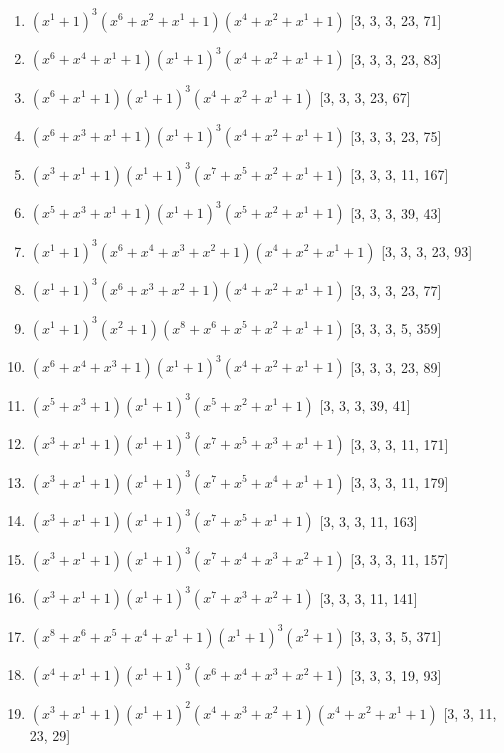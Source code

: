 \documentclass[10pt,twocolumn]{article}
\begin{document}
\begin{enumerate}
\item $(x^{1} + 1)^{3}(x^{6} + x^{2} + x^{1} + 1)(x^{4} + x^{2} + x^{1} + 1)$  [3, 3, 3, 23, 71]
\item $(x^{6} + x^{4} + x^{1} + 1)(x^{1} + 1)^{3}(x^{4} + x^{2} + x^{1} + 1)$  [3, 3, 3, 23, 83]
\item $(x^{6} + x^{1} + 1)(x^{1} + 1)^{3}(x^{4} + x^{2} + x^{1} + 1)$  [3, 3, 3, 23, 67]
\item $(x^{6} + x^{3} + x^{1} + 1)(x^{1} + 1)^{3}(x^{4} + x^{2} + x^{1} + 1)$  [3, 3, 3, 23, 75]
\item $(x^{3} + x^{1} + 1)(x^{1} + 1)^{3}(x^{7} + x^{5} + x^{2} + x^{1} + 1)$  [3, 3, 3, 11, 167]
\item $(x^{5} + x^{3} + x^{1} + 1)(x^{1} + 1)^{3}(x^{5} + x^{2} + x^{1} + 1)$  [3, 3, 3, 39, 43]
\item $(x^{1} + 1)^{3}(x^{6} + x^{4} + x^{3} + x^{2} + 1)(x^{4} + x^{2} + x^{1} + 1)$  [3, 3, 3, 23, 93]
\item $(x^{1} + 1)^{3}(x^{6} + x^{3} + x^{2} + 1)(x^{4} + x^{2} + x^{1} + 1)$  [3, 3, 3, 23, 77]
\item $(x^{1} + 1)^{3}(x^{2} + 1)(x^{8} + x^{6} + x^{5} + x^{2} + x^{1} + 1)$  [3, 3, 3, 5, 359]
\item $(x^{6} + x^{4} + x^{3} + 1)(x^{1} + 1)^{3}(x^{4} + x^{2} + x^{1} + 1)$  [3, 3, 3, 23, 89]
\item $(x^{5} + x^{3} + 1)(x^{1} + 1)^{3}(x^{5} + x^{2} + x^{1} + 1)$  [3, 3, 3, 39, 41]
\item $(x^{3} + x^{1} + 1)(x^{1} + 1)^{3}(x^{7} + x^{5} + x^{3} + x^{1} + 1)$  [3, 3, 3, 11, 171]
\item $(x^{3} + x^{1} + 1)(x^{1} + 1)^{3}(x^{7} + x^{5} + x^{4} + x^{1} + 1)$  [3, 3, 3, 11, 179]
\item $(x^{3} + x^{1} + 1)(x^{1} + 1)^{3}(x^{7} + x^{5} + x^{1} + 1)$  [3, 3, 3, 11, 163]
\item $(x^{3} + x^{1} + 1)(x^{1} + 1)^{3}(x^{7} + x^{4} + x^{3} + x^{2} + 1)$  [3, 3, 3, 11, 157]
\item $(x^{3} + x^{1} + 1)(x^{1} + 1)^{3}(x^{7} + x^{3} + x^{2} + 1)$  [3, 3, 3, 11, 141]
\item $(x^{8} + x^{6} + x^{5} + x^{4} + x^{1} + 1)(x^{1} + 1)^{3}(x^{2} + 1)$  [3, 3, 3, 5, 371]
\item $(x^{4} + x^{1} + 1)(x^{1} + 1)^{3}(x^{6} + x^{4} + x^{3} + x^{2} + 1)$  [3, 3, 3, 19, 93]
\item $(x^{3} + x^{1} + 1)(x^{1} + 1)^{2}(x^{4} + x^{3} + x^{2} + 1)(x^{4} + x^{2} + x^{1} + 1)$  [3, 3, 11, 23, 29]

\end{enumerate}
\end{document}
